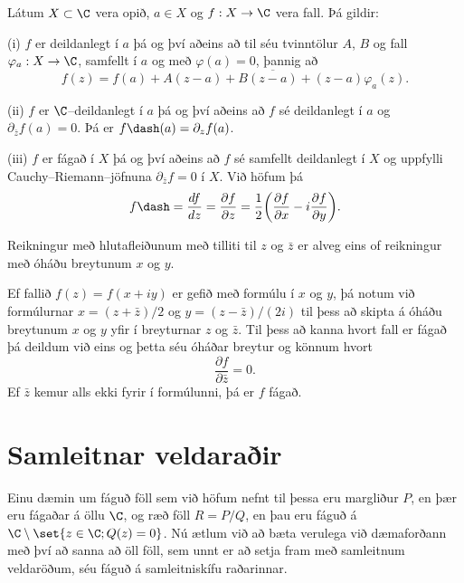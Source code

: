 \begin{se}  Látum $X\subset \C$ vera opið, $a\in X$ og $f:X\to \C$ vera
fall.  Þá gildir:

\smallskip\noindent
(i) $f$ er deildanlegt í $a$ þá og því aðeins að til séu tvinntölur $A$,
$B$ og fall $\varphi_a:X\to \C$, samfellt í $a$ og með
$\varphi(a)=0$, þannig að 
\begin{equation*}
f(z)=f(a)+A(z-a)+B\overline{(z-a)}+(z-a)\varphi_a(z).
\end{equation*} 

\smallskip\noindent
(ii) $f$ er $\C$--deildanlegt í $a$ þá og því aðeins að $f$ sé
deildanlegt í $a$ og ${\partial}_{\bar z}f(a)=0$.  Þá er
$f\dash(a)={\partial}_zf(a)$.

\smallskip\noindent
(iii) $f$ er fágað í $X$ þá og því aðeins að $f$ sé samfellt deildanlegt
í $X$ og uppfylli Cauchy--Riemann--jöfnuna ${\partial}_{\bar z}f=0$ í
$X$. Við höfum þá
\begin{equation*}
f\dash=\dfrac{df}{dz}=\dfrac{\partial f}{\partial z}=\dfrac 12\bigg(
\dfrac{\partial f}{\partial x}-i\dfrac{\partial f}{\partial y}\bigg).
\label{4.2.17}
\end{equation*}
\end{se}



Reikningur með hlutafleiðunum með tilliti til $z$ og $\bar z$ er alveg
eins of reikningur með óháðu breytunum $x$ og $y$.  


Ef fallið 
$f(z)=f(x+iy)$ er gefið með formúlu í $x$ og $y$, þá notum við
formúlurnar $x=(z+\bar z)/2$ og $y=(z-\bar z)/(2i)$ til þess að skipta
á óháðu breytunum $x$ og $y$ yfir í breyturnar $z$ og $\bar z$.  Til
þess að kanna hvort fall er fágað þá deildum við eins og þetta séu
óháðar breytur og könnum hvort 
$$
\dfrac{\partial f}{\partial\bar z}=0.
$$
Ef $\bar z$ kemur alls ekki fyrir í formúlunni, þá er $f$ fágað.

 

\section{Samleitnar veldaraðir} 

\noindent
Einu dæmin um fáguð föll sem við höfum nefnt til þessa eru margliður
$P$, en þær eru fágaðar á öllu $\C$, og ræð föll $R=P/Q$, en þau eru
fáguð á $\C\setminus\set{z\in \C; Q(z)=0}$.  Nú ætlum við að bæta
verulega við dæmaforðann með því að sanna að öll föll, sem unnt er að
setja fram með samleitnum veldaröðum, séu fáguð á samleitniskífu
raðarinnar. 


